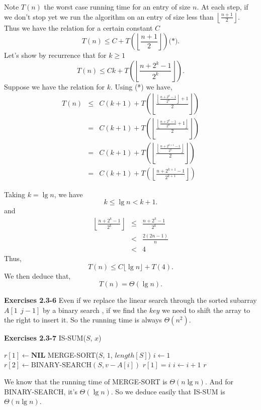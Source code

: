 \documentclass[a4paper,12pt]{article}
\newcommand{\newpar}[1]
{\bigskip \noindent \textbf{Exercises #1} \newline}
\newcommand{\la}{\leftarrow}
\begin{document}
Note $T(n)$ the worst case running time for an entry of size $n$.  At
each step, if we don't stop yet we run the algorithm on an entry of
size less than $\left\lfloor\frac{n+1}{2}\right\rfloor$.  Thus we have
the relation for a certain constant $C$
\[ T(n) \le C + 
T\left(\left\lfloor\frac{n+1}{2}\right\rfloor\right) \mbox{(*)}.\]
Let's show by recurrence that for $k \ge 1$
\[ T(n) \le C k + 
T\left(\left\lfloor\frac{n+2^k-1}{2^k}\right\rfloor\right).\]
Suppose we have the relation for $k$.  Using (*) we have,
\begin{eqnarray*}
T(n) &\le& C(k+1) + T\left(\left\lfloor\frac{
\left\lfloor\frac{n + 2^k - 1}{2^k}\right\rfloor + 1
}{2}\right\rfloor\right)\\ &=&
C(k+1) + T\left(\left\lfloor\frac{
\left\lfloor\frac{n + 2^k - 1}{2^k} + 1\right\rfloor
}{2}\right\rfloor\right)\\ &=&
C(k+1) + T\left(\left\lfloor\frac{
\left\lfloor\frac{n + 2^{k+1} - 1}{2^k}\right\rfloor
}{2}\right\rfloor\right)\\ &=&
C(k+1) + T\left(\left\lfloor
\frac{n + 2^{k+1} - 1}{2^{k+1}}\right\rfloor\right)
\end{eqnarray*}

\medskip
Taking $k = \lg n$, we have
\[ k \le \lg n < k+1.\]
and
\begin{eqnarray*}
\left\lfloor\frac{n + 2^k - 1}{2^k}\right\rfloor &\le&
\frac{n+2^k-1}{2^k}\\ &<&
\frac{2(2n-1)}{n}\\ &<&
4
\end{eqnarray*}
Thus,
\[ T(n) \le C \lfloor \lg n \rfloor + T(4).\]
We then deduce that,
\[ T(n) = \Theta(\lg n).\]

\newpar{2.3-6} Even if we replace the linear search through the sorted
subarray $A[1\ \ j-1]$ by a binary search , if we find the $key$ we
need to shift the array to the right to insert it.  So the running
time is always $\Theta(n^2)$.

\newpar{2.3-7}
IS-SUM($S$, $x$)
\begin{algorithmic}
\STATE $r[1] \la \mathbf{NIL}$ 
\STATE MERGE-SORT($S$, $1$, $length[S]$)
\STATE $i \la 1$
	\STATE $r[2] \la \mbox{BINARY-SEARCH}(S, v - A[i]) $
		\STATE $r[1] = i$
	\ENDIF
	\STATE $i \la i+1$
\ENDWHILE
\RETURN $r$	
\end{algorithmic}

We know that the running time of MERGE-SORT is $\Theta(n\lg n)$.  And
for BINARY-SEARCH, it's $\Theta(\lg n)$.  So we deduce easily that
IS-SUM is $\Theta(n\lg n)$.
\end{document}
